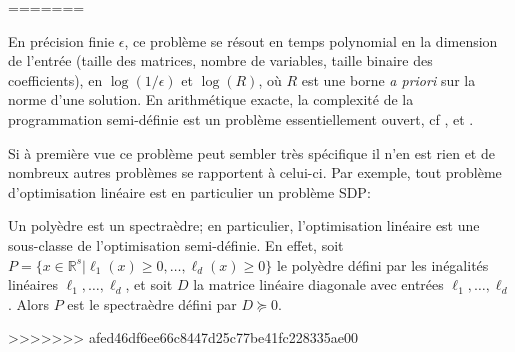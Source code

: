 
=======

En précision finie $\epsilon$, ce problème se résout en temps polynomial en la dimension de l'entrée (taille des matrices, nombre de variables, taille binaire des coefficients), en $\log(1/\epsilon)$ et $\log(R)$, où $R$ est une borne {\it a priori} sur la norme d'une solution. En arithmétique exacte, la complexité de la programmation semi-définie est un problème essentiellement ouvert, cf \cite[Sec.1.9]{deKlerk}, \cite{ramana1997exact,porkolab1997complexity} et \cite{henrion2016exact}.

Si à première vue ce problème peut sembler très spécifique il n'en est rien et de nombreux autres problèmes se rapportent à celui-ci. Par exemple, tout problème d'optimisation linéaire est en particulier un problème SDP:

\begin{remarque} Un polyèdre est un spectraèdre; en particulier, l'optimisation linéaire est une sous-classe de l'optimisation semi-définie. En effet, soit $P = \{x \in \mathbb{R}^s | \ell_1(x) \geq 0, \ldots, \ell_d(x) \geq 0\}$ le polyèdre défini par les inégalités linéaires $\ell_1,\ldots,\ell_d$, et soit $D$ la matrice linéaire diagonale avec entrées $\ell_1,\ldots,\ell_d$. Alors $P$ est le spectraèdre défini par $D \succeq 0$.
\end{remarque}
>>>>>>> afed46df6ee66c8447d25c77be41fc228335ae00

